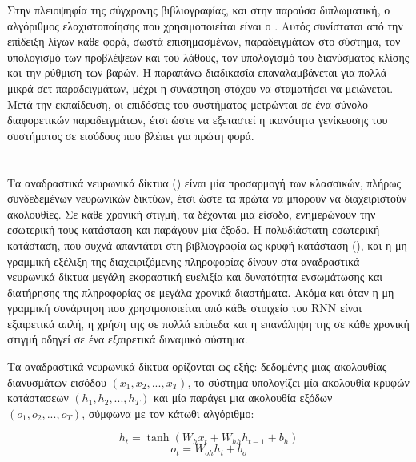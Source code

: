 Στην πλειοψηφία της σύγχρονης βιβλιογραφίας, και στην παρούσα διπλωματική, ο αλγόριθμος ελαχιστοποίησης που χρησιμοποιείται είναι ο .
Αυτός συνίσταται από την επίδειξη λίγων κάθε φορά, σωστά επισημασμένων, παραδειγμάτων στο σύστημα, τον υπολογισμό των προβλέψεων και του λάθους, τον υπολογισμό του διανύσματος κλίσης και την ρύθμιση των βαρών.
Η παραπάνω διαδικασία επαναλαμβάνεται για πολλά μικρά σετ παραδειγμάτων, μέχρι η συνάρτηση στόχου να σταματήσει να μειώνεται.
Μετά την εκπαίδευση, οι επιδόσεις του συστήματος μετρώνται σε ένα σύνολο διαφορετικών παραδειγμάτων, έτσι ώστε να εξεταστεί η ικανότητα γενίκευσης του συστήματος σε εισόδους που βλέπει για πρώτη φορά.
 
\section{}

Τα αναδραστικά νευρωνικά δίκτυα () είναι μία προσαρμογή των κλασσικών, πλήρως συνδεδεμένων νευρωνικών δικτύων, έτσι ώστε τα πρώτα να μπορούν να διαχειριστούν ακολουθίες. 
Σε κάθε χρονική στιγμή, τα  δέχονται μια είσοδο, ενημερώνουν την εσωτερική τους κατάσταση και παράγουν μία έξοδο.
Η πολυδιάστατη εσωτερική κατάσταση, που συχνά απαντάται στη βιβλιογραφία ως κρυφή κατάσταση (), και η μη γραμμική εξέλιξη της διαχειριζόμενης πληροφορίας δίνουν στα αναδραστικά νευρωνικά δίκτυα μεγάλη εκφραστική ευελιξία και δυνατότητα ενσωμάτωσης και διατήρησης της πληροφορίας σε μεγάλα χρονικά διαστήματα.
Ακόμα και όταν η μη γραμμική συνάρτηση που χρησιμοποιείται από κάθε στοιχείο του RNN είναι εξαιρετικά απλή, η χρήση της σε πολλά επίπεδα και η επανάληψη της σε κάθε χρονική στιγμή οδηγεί σε ένα εξαιρετικά δυναμικό σύστημα. 

Τα αναδραστικά νευρωνικά δίκτυα ορίζονται ως εξής: δεδομένης μιας ακολουθίας διανυσμάτων εισόδου $(x_1, x_2, ..., x_T)$, το σύστημα υπολογίζει μία ακολουθία κρυφών κατάστασεων $(h_1, h_2, ..., h_T)$ και μία παράγει μια ακολουθία εξόδων $(ο_1, ο_2, ..., ο_T)$, σύμφωνα με τον κάτωθι αλγόριθμο:


\begin{algorithm}
\caption{}
\begin{algorithmic}
\STATE \begin{equation}
h_t = \tanh(W_h x_t + W_{hh} h_{t-1} + b_h)\label{eq:h}
\end{equation}
\STATE \begin{equation}
o_t = W_{oh} h_t + b_o
\end{equation}
\ENDFOR
\end{algorithmic}
\end{algorithm}

